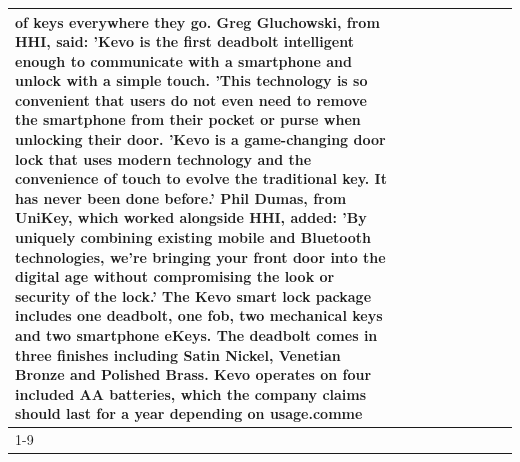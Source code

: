 \begin{table}[H]
\begin{tabular}{lllrlllll}
of keys everywhere they go. Greg Gluchowski, from HHI, said: 'Kevo is the first deadbolt intelligent enough to communicate with a smartphone and unlock with a simple touch. 'This technology is so convenient that users do not even need to remove the smartphone from their pocket or purse when unlocking their door. 'Kevo is a game-changing door lock that uses modern technology and the convenience of touch to evolve the traditional key. It has never been done before.' Phil Dumas, from UniKey, which worked alongside HHI, added: 'By uniquely combining existing mobile and Bluetooth technologies, we’re bringing your front door into the digital age without compromising the look or security of the lock.' The Kevo smart lock package includes one deadbolt, one fob, two mechanical keys and two smartphone eKeys. The deadbolt comes in three finishes including Satin Nickel, Venetian Bronze and Polished Brass. Kevo operates on four included AA batteries, which the company claims should last for a year depending on usage.comme \\
\cline{1-9}

\end{tabular}
\end{table}
